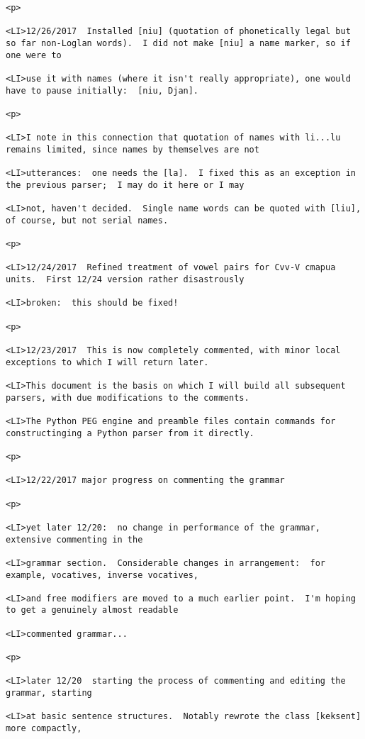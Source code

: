 \documentclass[12pt]{article}
\begin{document}
\begin{lstlisting}
<p>

<LI>12/26/2017  Installed [niu] (quotation of phonetically legal but so far non-Loglan words).  I did not make [niu] a name marker, so if one were to

<LI>use it with names (where it isn't really appropriate), one would have to pause initially:  [niu, Djan].

<p>

<LI>I note in this connection that quotation of names with li...lu remains limited, since names by themselves are not

<LI>utterances:  one needs the [la].  I fixed this as an exception in the previous parser;  I may do it here or I may

<LI>not, haven't decided.  Single name words can be quoted with [liu], of course, but not serial names.

<p>

<LI>12/24/2017  Refined treatment of vowel pairs for Cvv-V cmapua units.  First 12/24 version rather disastrously

<LI>broken:  this should be fixed!

<p>

<LI>12/23/2017  This is now completely commented, with minor local exceptions to which I will return later.

<LI>This document is the basis on which I will build all subsequent parsers, with due modifications to the comments.

<LI>The Python PEG engine and preamble files contain commands for constructinging a Python parser from it directly.

<p>

<LI>12/22/2017 major progress on commenting the grammar

<p>

<LI>yet later 12/20:  no change in performance of the grammar, extensive commenting in the

<LI>grammar section.  Considerable changes in arrangement:  for example, vocatives, inverse vocatives,

<LI>and free modifiers are moved to a much earlier point.  I'm hoping to get a genuinely almost readable

<LI>commented grammar...

<p>

<LI>later 12/20  starting the process of commenting and editing the grammar, starting

<LI>at basic sentence structures.  Notably rewrote the class [keksent] more compactly,


\end{lstlisting}
\end{document}

